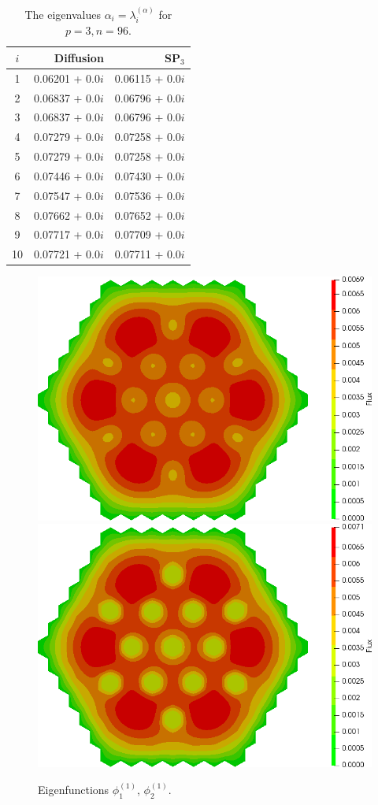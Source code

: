 \documentclass[authoryear]{elsarticle}
\begin{document}
\begin{table}[h]
\caption{The eigenvalues $\alpha_i=\lambda_i^{(\alpha)}$ for $p=3, n=96$.}
\label{tab:iaea_without_alpha_del_10}
\begin{center}
\begin{tabular}{c r r}
\hline
$i$ & Diffusion & SP$_3$ \\
\hline
1& 0.06201 + 0.0$i$&0.06115 + 0.0$i$\\
2& 0.06837 + 0.0$i$&0.06796 + 0.0$i$\\
3& 0.06837 + 0.0$i$&0.06796 + 0.0$i$\\
4& 0.07279 + 0.0$i$&0.07258 + 0.0$i$\\
5& 0.07279 + 0.0$i$&0.07258 + 0.0$i$\\
6& 0.07446 + 0.0$i$&0.07430 + 0.0$i$\\
7& 0.07547 + 0.0$i$&0.07536 + 0.0$i$\\
8& 0.07662 + 0.0$i$&0.07652 + 0.0$i$\\
9& 0.07717 + 0.0$i$&0.07709 + 0.0$i$\\
10& 0.07721 + 0.0$i$&0.07711 + 0.0$i$\\
\hline
\end{tabular}
\end{center}
\end{table}

\begin{figure}[h]
\begin{center}
	\includegraphics[width=0.49\linewidth]{iaea_without/alpha_delayed_sp3_u1_1_without.png}
	\includegraphics[width=0.49\linewidth]{iaea_without/alpha_delayed_sp3_u2_1_without.png}\\
	\caption{Eigenfunctions $\phi_1^{(1)}$, $\phi_2^{(1)}$.}
	\label{fig:iaea_without_fun_del_1}
\end{center}
\end{figure}
\end{document}
